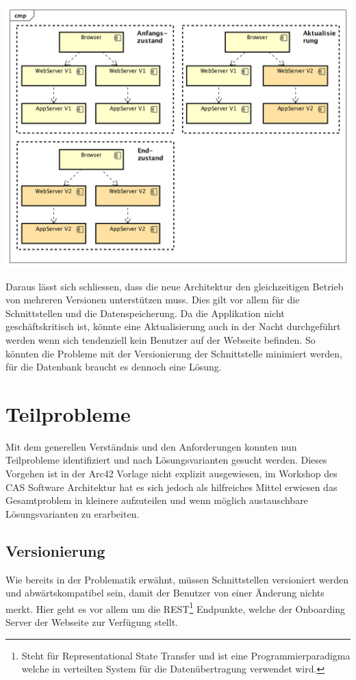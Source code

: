 \begin{center}
	\includegraphics[scale=0.55]{MultiVersion.png}
\end{center}
Daraus lässt sich schliessen, dass die neue Architektur den gleichzeitigen Betrieb von mehreren Versionen unterstützen muss. Dies gilt vor allem für die Schnittstellen und die Datenspeicherung. Da die Applikation nicht geschäftskritisch ist, könnte eine Aktualisierung auch in der Nacht durchgeführt werden wenn sich tendenziell kein Benutzer auf der Webseite befinden. So könnten die Probleme mit der Versionierung der Schnittstelle minimiert werden, für die Datenbank braucht es dennoch eine Lösung.	

	\section{Teilprobleme}

Mit dem generellen Verständnis und den Anforderungen konnten nun Teilprobleme identifiziert und nach Lösungsvarianten gesucht werden. Dieses Vorgehen ist in der Arc42 Vorlage nicht explizit ausgewiesen, im Workshop des CAS Software Architektur hat es sich jedoch als hilfreiches Mittel erwiesen das Gesamtproblem in kleinere aufzuteilen und wenn möglich austauschbare Lösungsvarianten zu erarbeiten.

\subsection{Versionierung}

Wie bereits in der Problematik erwähnt, müssen Schnittstellen versioniert werden und abwärtskompatibel sein, damit der Benutzer von einer Änderung nichts merkt. Hier geht es vor allem um die REST\footnote{Steht für Representational State Transfer und ist eine Programmierparadigma welche in verteilten System für die Datenübertragung verwendet wird.} Endpunkte, welche der Onboarding Server der Webseite zur Verfügung stellt.

